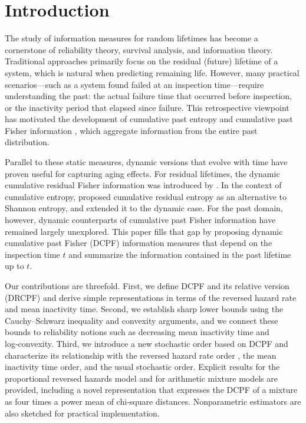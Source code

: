 \documentclass[twoside]{article}
\begin{document}
\section{Introduction}\label{intro}
The study of information measures for random lifetimes has become a cornerstone of reliability theory, survival analysis, and information theory. Traditional approaches primarily focus on the residual (future) lifetime of a system, which is natural when predicting remaining life. However, many practical scenarios—such as a system found failed at an inspection time—require understanding the past: the actual failure time that occurred before inspection, or the inactivity period that elapsed since failure. This retrospective viewpoint has motivated the development of cumulative past entropy \cite{di2009cumulative} and cumulative past Fisher information \cite{balakrishnan2022cumulative}, which aggregate information from the entire past distribution.

Parallel to these static measures, dynamic versions that evolve with time have proven useful for capturing aging effects. For residual lifetimes, the dynamic cumulative residual Fisher information was introduced by \cite{kharazmi2021cumulative}. In the context of cumulative entropy, \cite{rao2004cumulative} proposed cumulative residual entropy as an alternative to Shannon entropy, and \cite{asadi2007dynamic} extended it to the dynamic case. For the past domain, however, dynamic counterparts of cumulative past Fisher information have remained largely unexplored. This paper fills that gap by proposing dynamic cumulative past Fisher (DCPF) information measures that depend on the inspection time $t$ and summarize the information contained in the past lifetime up to $t$.

Our contributions are threefold. First, we define DCPF and its relative version (DRCPF) and derive simple representations in terms of the reversed hazard rate and mean inactivity time. Second, we establish sharp lower bounds using the Cauchy–Schwarz inequality and convexity arguments, and we connect these bounds to reliability notions such as decreasing mean inactivity time and log‑convexity. Third, we introduce a new stochastic order based on DCPF and characterize its relationship with the reversed hazard rate order \cite{gupta2001reversed}, the mean inactivity time order, and the usual stochastic order. Explicit results for the proportional reversed hazards model and for arithmetic mixture models are provided, including a novel representation that expresses the DCPF of a mixture as four times a power mean of chi‑square distances. Nonparametric estimators are also sketched for practical implementation.
\end{document}
